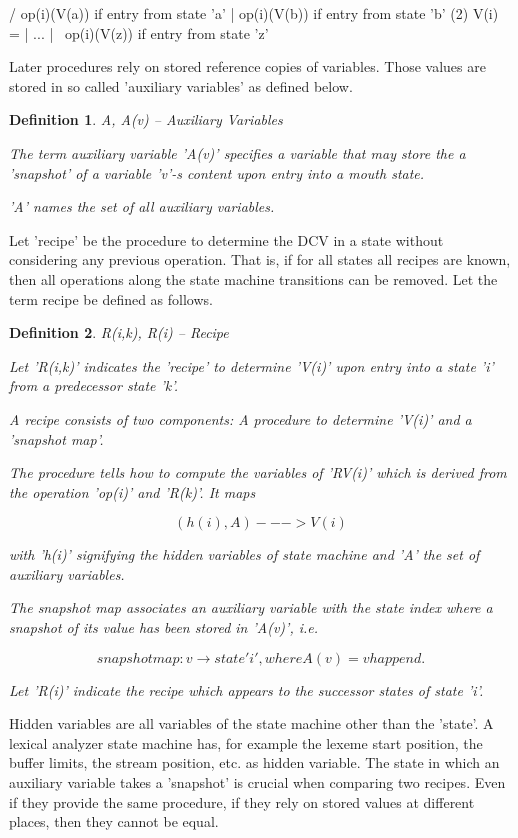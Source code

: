 \documentclass[12pt]{article}
\newtheorem{definition}{Definition}
\begin{document}
                    /  op(i)(V(a))  if entry from state 'a'
                    |  op(i)(V(b))  if entry from state 'b'             (2)
            V(i) =  |   ...
                    |  
                    \  op(i)(V(z))  if entry from state 'z'

Later procedures rely on stored reference copies of variables. Those values
are stored in so called 'auxiliary variables' as defined below.

\begin{definition}
A, A(v) -- Auxiliary Variables

The term auxiliary variable 'A(v)' specifies a variable that may store the
a 'snapshot' of a variable 'v'-s content upon entry into a mouth state. 
   
'A' names the set of all auxiliary variables.
\end{definition}

Let 'recipe' be the procedure to determine the DCV in a state without
considering any previous operation. That is, if for all states all recipes are
known, then all operations along the state machine transitions can be removed.
Let the term recipe be defined as follows.

\begin{definition}
R(i,k), R(i) -- Recipe 

Let 'R(i,k)' indicates the 'recipe' to determine 'V(i)' upon entry into a
state 'i' from a predecessor state 'k'.  

A recipe consists of two components: A procedure to determine 'V(i)' and a
'snapshot map'. 

The procedure tells how to compute the variables of 'RV(i)' which is derived
from the operation 'op(i)' and 'R(k)'.  It maps

\[
    (h(i), A) ---> V(i)                                             
\]

with 'h(i)' signifying the hidden variables of state machine and 'A' the
set of auxiliary variables. 

The snapshot map associates an auxiliary variable with the state index
where a snapshot of its value has been stored in 'A(v)', i.e.

\[
    snapshot map:  v \rightarrow state 'i', where A(v) = v happend.
\]

Let 'R(i)' indicate the recipe which appears to the successor states of
state 'i'.
\end{definition}

Hidden variables are all variables of the state machine other than the 'state'.
A lexical analyzer state machine has, for example the lexeme start position,
the buffer limits, the stream position, etc. as hidden variable. The state
in which an auxiliary variable takes a 'snapshot' is crucial when comparing
two recipes. Even if they provide the same procedure, if they rely on stored
values at different places, then they cannot be equal.
\end{document}
